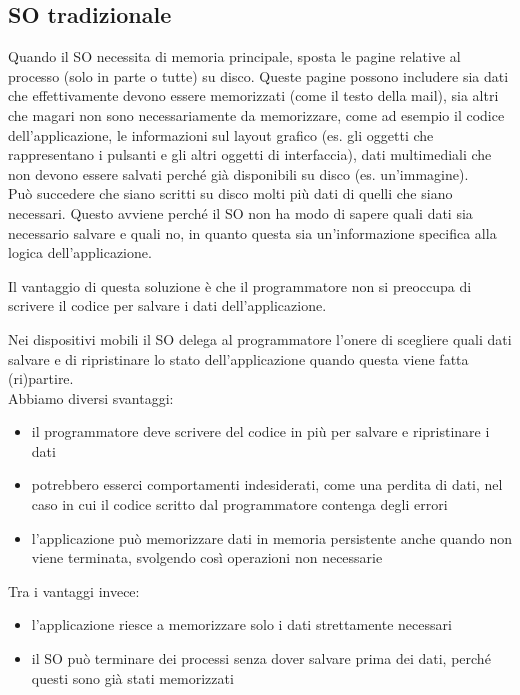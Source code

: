 \subsection{SO tradizionale}
Quando il SO necessita di memoria principale, sposta le pagine relative al processo (solo in parte o tutte) su disco. 
Queste pagine possono includere sia dati che effettivamente devono essere memorizzati (come il testo della mail), sia altri che magari non sono necessariamente da memorizzare, come ad esempio il codice dell'applicazione, le informazioni sul layout grafico (es. gli oggetti che rappresentano i pulsanti e gli altri oggetti di interfaccia), dati multimediali che non devono essere salvati perché
già disponibili su disco (es. un’immagine). 
\\ Può succedere che siano scritti su disco molti più dati di quelli che siano necessari. Questo avviene perché il SO non ha modo di sapere quali dati sia necessario salvare e quali no, in quanto questa sia un'informazione specifica alla logica dell'applicazione.

Il vantaggio  di questa soluzione è che il programmatore non si preoccupa di scrivere il codice per salvare i dati dell'applicazione. 

Nei dispositivi mobili il SO delega al programmatore l’onere di scegliere quali dati salvare e di ripristinare lo stato dell'applicazione quando questa viene fatta (ri)partire. 
\\ Abbiamo diversi svantaggi: 
\begin{itemize}
    \item il programmatore deve scrivere del codice in più per salvare e ripristinare i dati
    \item potrebbero esserci comportamenti indesiderati, come una perdita di dati, nel caso in cui il codice scritto dal programmatore contenga degli errori
    \item l'applicazione può memorizzare dati in memoria persistente anche quando non viene terminata, svolgendo così operazioni non necessarie
\end{itemize}
Tra i vantaggi invece:
\begin{itemize}
    \item l'applicazione riesce a memorizzare solo i dati strettamente necessari
    \item il SO può terminare dei processi senza dover salvare prima dei dati, perché questi sono già stati memorizzati
\end{itemize}

